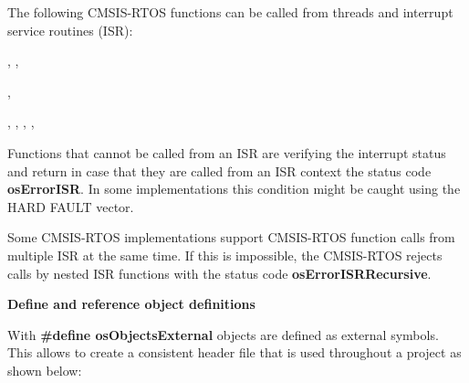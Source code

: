 The following CMSIS-\/\+RTOS functions can be called from threads and interrupt service routines (ISR)\+:
\begin{DoxyItemize}
\item {}
\item {}
\item {}, , 
\item {}, 
\item {}, , , , 
\end{DoxyItemize}

Functions that cannot be called from an ISR are verifying the interrupt status and return in case that they are called from an ISR context the status code {\bfseries{os\+Error\+ISR}}. In some implementations this condition might be caught using the HARD FAULT vector.

Some CMSIS-\/\+RTOS implementations support CMSIS-\/\+RTOS function calls from multiple ISR at the same time. If this is impossible, the CMSIS-\/\+RTOS rejects calls by nested ISR functions with the status code {\bfseries{os\+Error\+ISRRecursive}}.

{\bfseries{Define and reference object definitions}}

With {\bfseries{\#define os\+Objects\+External}} objects are defined as external symbols. This allows to create a consistent header file that is used throughout a project as shown below\+:

